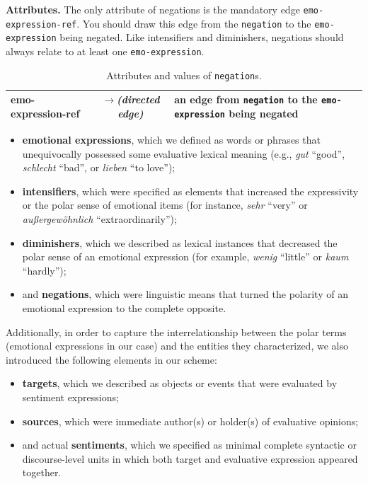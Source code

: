 \noindent\textbf{Attributes.} The only attribute of negations is the
mandatory edge \texttt{emo-expression-ref}.  You should draw this edge
from the \texttt{negation} to the \texttt{emo-expression} being
negated.  Like intensifiers and diminishers, negations should always
relate to at least one \texttt{emo-expression}.
\begin{center}
  \begin{table}
    \caption{Attributes and values of \texttt{negation}s.}
    \begin{tabular}{|l|c|p{0.875\clmnwidth}|}\hline
      emo-expression-ref & \textit{$\longrightarrow$\newline(directed
        edge)} & an edge from \texttt{negation} to the
      \texttt{emo-expression} being negated\\\hline
    \end{tabular}
    \label{tbl:negation}
  \end{table}
\end{center}

\begin{itemize}
  \item\textbf{emotional expressions}, which we defined as words or
    phrases that unequivocally possessed some evaluative lexical
    meaning (e.g., \emph{gut} ``good'', \emph{schlecht} ``bad'', or
    \emph{lieben} ``to love'');
  \item\textbf{intensifiers}, which were specified as elements that
    increased the expressivity or the polar sense of emotional items
    (for instance, \emph{sehr} ``very'' or
    \emph{au\ss{}ergew\"ohnlich} ``extraordinarily'');
  \item\textbf{diminishers}, which we described as lexical instances
    that decreased the polar sense of an emotional expression (for
    example, \emph{wenig} ``little'' or \emph{kaum} ``hardly'');
  \item and \textbf{negations}, which were linguistic means that
    turned the polarity of an emotional expression to the complete
    opposite.
\end{itemize}

Additionally, in order to capture the interrelationship between the
polar terms (emotional expressions in our case) and the entities they
characterized, we also introduced the following elements in our
scheme:
\begin{itemize}
  \item\textbf{targets}, which we described as objects or events that
    were evaluated by sentiment expressions;
  \item\textbf{sources}, which were immediate author(s) or holder(s)
    of evaluative opinions;
  \item and actual \textbf{sentiments}, which we specified as minimal
    complete syntactic or discourse-level units in which both target
    and evaluative expression appeared together.
\end{itemize}

